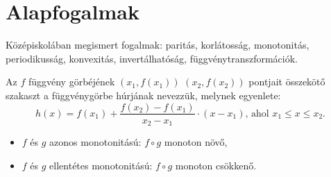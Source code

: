 \section{Alapfogalmak}

\begin{note}
  Középiskolában megismert fogalmak: paritás, korlátosság, monotonitás,
  periodikusság, konvexitás, invertálhatóság, függvénytranszformációk.
\end{note}

\begin{definition}
  Az $f$ függvény görbéjének $(x_1, f(x_1))$ $(x_2, f(x_2))$ pontjait összekötő
  szakaszt a függvénygörbe húrjának nevezzük, melynek egyenlete:
  \[
    h(x) = f(x_1) + \frac{f(x_2) - f(x_1)}{x_2 - x_1} \cdot (x - x_1)
    \text{, ahol $x_1 \leq x \leq x_2$.}
  \]
\end{definition}

\begin{blueBox}
  \begin{itemize}
    \item $f$ és $g$ azonos monotonitású: $f \circ g$ monoton növő,
    \item $f$ és $g$ ellentétes monotonitású: $f \circ g$ monoton csökkenő.
  \end{itemize}
\end{blueBox}
